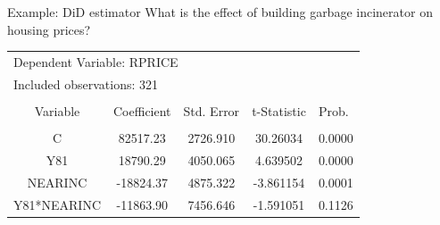 \documentclass{beamer}
\begin{document}
\begin{frame}{Example: DiD estimator}
\footnotesize{What is the effect of building garbage incinerator on housing prices?}
\scriptsize
\begin{table}[]
\centering
\label{Tab21}
\begin{tabular}{lclcc}
\multicolumn{3}{l}{Dependent Variable: RPRICE}                                          &                      & \multicolumn{1}{l}{}      \\
\multicolumn{3}{l}{Included observations: 321}                                          &                      & \multicolumn{1}{l}{}      \\
                                &                      & \multicolumn{1}{c}{}           &                      & \multicolumn{1}{l}{}      \\
\multicolumn{1}{c}{Variable}    & Coefficient          & \multicolumn{1}{c}{Std. Error} & t-Statistic          & \multicolumn{1}{l}{Prob.} \\
                                
                                & \multicolumn{1}{l}{} &                                & \multicolumn{1}{l}{} & \multicolumn{1}{l}{}      \\
\multicolumn{1}{c}{C}           & 82517.23             & \multicolumn{1}{c}{2726.910}   & 30.26034             & 0.0000                    \\
\multicolumn{1}{c}{Y81}         & 18790.29             & \multicolumn{1}{c}{4050.065}   & 4.639502             & 0.0000                    \\
\multicolumn{1}{c}{NEARINC}     & -18824.37            & \multicolumn{1}{c}{4875.322}   & -3.861154            & 0.0001                    \\
\multicolumn{1}{c}{Y81*NEARINC} & -11863.90            & \multicolumn{1}{c}{7456.646}   & -1.591051            & 0.1126                    \\
                                

\end{tabular}
\end{table}
\end{frame}
\end{document}
